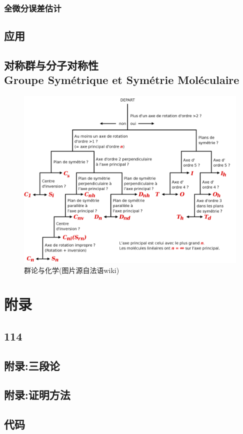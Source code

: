 \documentclass[12pt, a4paper, oneside]{ctexbook}
\begin{document}
  \section{全微分误差估计}
  \chapter{应用}  
  \section{}
  \chapter{对称群与分子对称性\\ Groupe Symétrique et Symétrie Moléculaire}
  \begin{figure}[H]%
    \centering
    \includegraphics[scale=0.15]{groupe_chimie.png}
    \caption{群论与化学(图片源自法语wiki)}
    \label{myref:groupechimie}
  \end{figure}

  \part{附录}
  \appendix
  \chapter{114}
  \chapter{附录:三段论}
  \chapter{附录:证明方法}
  \chapter{代码}

  \printindex
\end{document}
